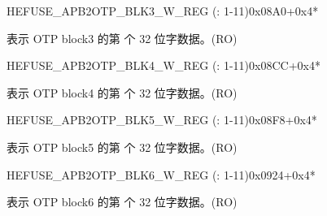 \begin{register}{H}{EFUSE\_APB2OTP\_BLK3\_W\_REG (: 1-11)}{0x08A0+0x4*}\label{regdesc:EFUSEAPB2OTPBLK3WNREG}
%
\regnewline%
\begin{regdesc}\begin{reglist}
\label{fielddesc:EFUSEAPB2OTPBLOCK3WN}\item [EFUSE\_APB2OTP\_BLOCK3\_W\regindex{n}] 表示 OTP block3 的第  个 32 位字数据。(RO)
\end{reglist}\end{regdesc}
\end{register}

\begin{register}{H}{EFUSE\_APB2OTP\_BLK4\_W\_REG (: 1-11)}{0x08CC+0x4*}\label{regdesc:EFUSEAPB2OTPBLK4WNREG}
%
\regnewline%
\begin{regdesc}\begin{reglist}
\label{fielddesc:EFUSEAPB2OTPBLOCK4WN}\item [EFUSE\_APB2OTP\_BLOCK4\_W\regindex{n}] 表示 OTP block4 的第  个 32 位字数据。(RO)
\end{reglist}\end{regdesc}
\end{register}

\begin{register}{H}{EFUSE\_APB2OTP\_BLK5\_W\_REG (: 1-11)}{0x08F8+0x4*}\label{regdesc:EFUSEAPB2OTPBLK5WNREG}
%
\regnewline%
\begin{regdesc}\begin{reglist}
\label{fielddesc:EFUSEAPB2OTPBLOCK5WN}\item [EFUSE\_APB2OTP\_BLOCK5\_W\regindex{n}] 表示 OTP block5 的第  个 32 位字数据。(RO)
\end{reglist}\end{regdesc}
\end{register}

\begin{register}{H}{EFUSE\_APB2OTP\_BLK6\_W\_REG (: 1-11)}{0x0924+0x4*}\label{regdesc:EFUSEAPB2OTPBLK6WNREG}
%
\regnewline%
\begin{regdesc}\begin{reglist}
\label{fielddesc:EFUSEAPB2OTPBLOCK6WN}\item [EFUSE\_APB2OTP\_BLOCK6\_W\regindex{n}] 表示 OTP block6 的第  个 32 位字数据。(RO)
\end{reglist}\end{regdesc}
\end{register}

